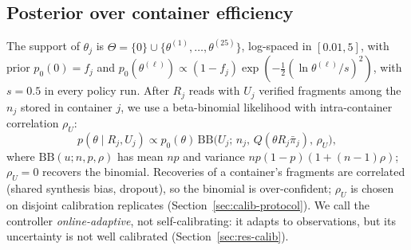 \documentclass[acmsmall,screen]{acmart}
\begin{document}
\subsection{Posterior over container efficiency}
The support of $\theta_j$ is $\Theta=\{0\}\cup\{\theta^{(1)},\dots,\theta^{(25)}\}$, log-spaced in
$[0.01,5]$, with prior $p_0(0)=f_j$ and $p_0(\theta^{(\ell)})\propto(1-f_j)\exp(-\frac12(\ln\theta^{(\ell)}/s)^2)$,
with $s=0.5$ in every policy run.  After $R_j$ reads with $U_j$ verified fragments among the $n_j$ stored in container
$j$, we use a beta-binomial likelihood with intra-container correlation $\rho_U$:
\begin{equation}
p(\theta\mid R_j,U_j)\propto p_0(\theta)\,\mathrm{BB}\big(U_j;\,n_j,\,Q(\theta R_j\bar\pi_j),\,\rho_U\big),
\label{eq:posterior}
\end{equation}
where $\mathrm{BB}(u;n,p,\rho)$ has mean $np$ and variance $np(1-p)(1+(n-1)\rho)$; $\rho_U{=}0$
recovers the binomial.  Recoveries of a container's fragments are correlated (shared synthesis
bias, dropout), so the binomial is over-confident; $\rho_U$ is chosen on disjoint calibration
replicates (Section~\ref{sec:calib-protocol}).  We call the controller \emph{online-adaptive},
not self-calibrating: it adapts to observations, but its uncertainty is not well calibrated
(Section~\ref{sec:res-calib}).
\end{document}

